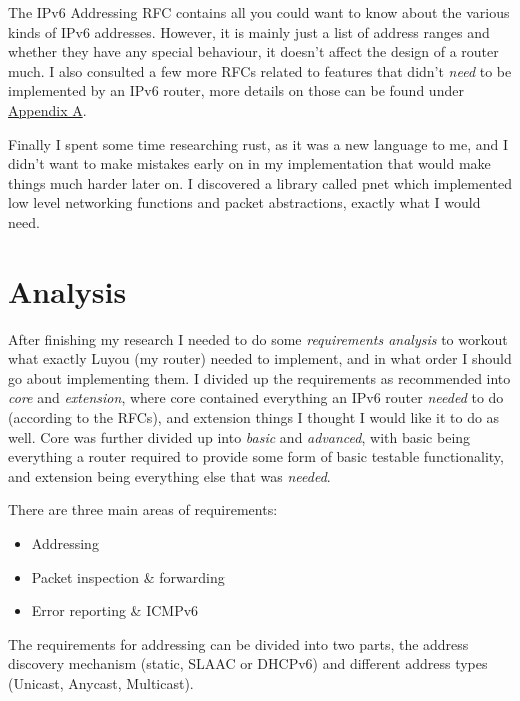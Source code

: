 \documentclass[12pt,a4paper,twoside,openright]{report}
\begin{document}
\bigskip

The IPv6 Addressing RFC\cite{ipv6_rfc_adr} contains all you could want to know about the various kinds of IPv6 addresses. However, it is mainly just a list of address ranges and whether they have any special behaviour, it doesn't affect the design of a router much.  I also consulted a few more RFCs related to features that didn't \textit{need} to be implemented by an IPv6 router, more details on those can be found under \hyperref[appendix::requirements]{Appendix A}.

\bigskip

Finally I spent some time researching rust, as it was a new language to me, and I didn't want to make mistakes early on in my implementation that would make things much harder later on.  I discovered a library called pnet\cite{pnet_rust} which implemented low level networking functions and packet abstractions, exactly what I would need.

\section{Analysis}

After finishing my research I needed to do some \textit{requirements analysis} to workout what exactly Luyou (my router) needed to implement, and in what order I should go about implementing them.  I divided up the requirements as recommended into \textit{core} and \textit{extension}, where core contained everything an IPv6 router \textit{needed} to do (according to the RFCs), and extension things I thought I would like it to do as well.  Core was further divided up into \textit{basic} and \textit{advanced}, with basic being everything a router required to provide some form of basic testable functionality, and extension being everything else that was \textit{needed}.

\bigskip

There are three main areas of requirements:
\begin{itemize}
\item Addressing
\item Packet inspection \& forwarding
\item Error reporting \& ICMPv6\cite{icmpv6_rfc}
\end{itemize}

\bigskip

The requirements for addressing can be divided into two parts, the address discovery mechanism (static, SLAAC\cite{slaac_rfc} or DHCPv6\cite{dhcpv6_rfc}) and different address types (Unicast, Anycast, Multicast).  
\end{document}
